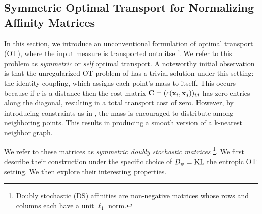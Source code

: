 \subsection{Symmetric Optimal Transport for Normalizing Affinity Matrices}\label{sec:doubly_sto}

In this section, we introduce an unconventional formulation of optimal transport (OT), where the input measure is transported onto itself. We refer to this problem as \emph{symmetric} or \emph{self} optimal transport. A noteworthy initial observation is that the unregularized OT problem of  has a trivial solution under this setting: the identity coupling, which assigns each point's mass to itself. This occurs because if $c$ is a distance then the cost matrix $\mathbf{C} = (c({\mathbf{x}}_i, {\mathbf{x}}_j))_{ij}$ has zero entries along the diagonal, resulting in a total transport cost of zero. However, by introducing constraints as in , the mass is encouraged to distribute among neighboring points. This results in producing a smooth version of a k-nearest neighbor graph.

We refer to these matrices as \emph{symmetric doubly stochastic matrices} \footnote{Doubly stochastic (DS) affinities are non-negative matrices whose rows and columns each have a unit $\ell_1$ norm.}. We first describe their construction under the specific choice of $D_\psi = \operatorname{KL}$ \ie the entropic OT setting. We then explore their interesting properties.

